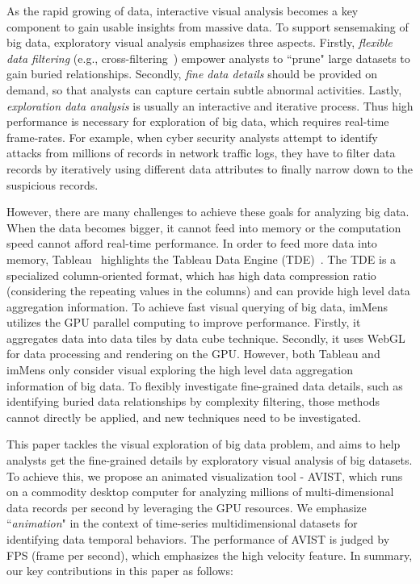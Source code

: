 
\maketitle


As the rapid growing of data, interactive visual analysis becomes a key component to gain usable insights from massive data. To support sensemaking of big data, exploratory visual analysis emphasizes three aspects. Firstly, \textsl{flexible data filtering} (e.g., cross-filtering~\cite{ weaver2008, weaver2010}) empower analysts to ``prune" large datasets to gain buried relationships. Secondly, \textsl{fine data details} should be provided on demand, so that analysts can capture certain subtle abnormal activities. Lastly, \textsl{exploration data analysis} is usually an interactive and iterative process. Thus high performance is necessary for exploration of big data, which requires real-time frame-rates. For example, when cyber security analysts attempt to identify attacks from millions of records in network traffic logs, they have to filter data records by iteratively using different data attributes to finally narrow down to the suspicious records.  

However, there are many challenges to achieve these goals for analyzing big data.
 When the data becomes bigger, it cannot feed into memory or the computation speed cannot afford real-time performance. In order to feed more data into memory, Tableau~\cite{tab} highlights the Tableau Data Engine (TDE)~\cite{Wesley}. The TDE is a specialized column-oriented format, which has high data compression ratio (considering the repeating values in the columns) and can provide high level data aggregation information. To achieve fast visual querying of big data, imMens~\cite{2013-immens} utilizes the GPU parallel computing to improve performance. Firstly, it aggregates data into data tiles by data cube technique. Secondly, it uses WebGL for data processing and rendering on the GPU. However, both Tableau and imMens only consider visual exploring the high level data aggregation information of big data. To flexibly investigate fine-grained data details, such as identifying buried data relationships by complexity filtering, those methods cannot directly be applied, and new techniques need to be investigated.   

This paper tackles the visual exploration of big data problem,  and aims to help analysts  get the fine-grained details by exploratory visual analysis of big datasets. To achieve this, we propose an animated visualization tool - AVIST, which runs on a  commodity desktop computer for analyzing millions of multi-dimensional data records per second by leveraging the GPU resources. We emphasize ``\textit{animation}" in the context of time-series multidimensional datasets for identifying data temporal behaviors. The performance of AVIST is judged by FPS (frame per second), which emphasizes the high velocity feature. In summary, our key contributions in this paper as follows:

